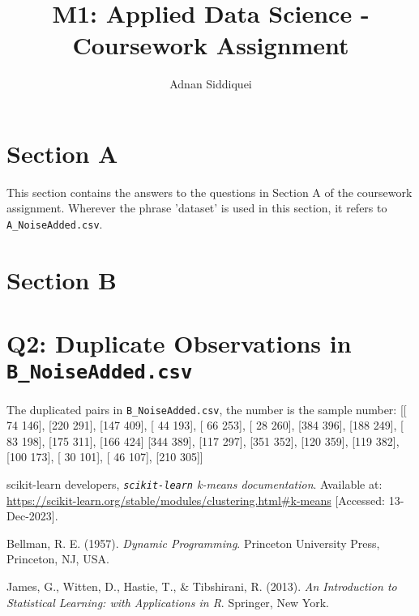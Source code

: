 \documentclass[a4paper,11pt]{article}
\title{\boldmath M1: Applied Data Science - Coursework Assignment}
\author{Adnan Siddiquei}
\affiliation{University of Cambridge}
\newcommand{\inlinecode}[1]{\lstinline{#1}}
\begin{document}
\maketitle
\flushbottom


\section{Section A}\label{sec:section-a}
This section contains the answers to the questions in Section A of the coursework assignment.
Wherever the phrase 'dataset' is used in this section, it refers to \inlinecode{A_NoiseAdded.csv}.





\section{Section B}\label{sec:section-b}


\appendix

\section{Q2: Duplicate Observations in \inlinecode{B_NoiseAdded.csv}}\label{appendix:q2}
The duplicated pairs in \inlinecode{B_NoiseAdded.csv}, the number is the sample number:
[[ 74 146], [220 291], [147 409], [ 44 193], [ 66 253], [ 28 260], [384 396], [188 249], [ 83 198], [175 311], [166 424]
 [344 389], [117 297], [351 352], [120 359], [119 382], [100 173], [ 30 101], [ 46 107], [210 305]]


\begin{thebibliography}{99}

scikit-learn developers,
\textit{\inlinecode{scikit-learn} k-means documentation}.
Available at: \url{https://scikit-learn.org/stable/modules/clustering.html#k-means}
[Accessed: 13-Dec-2023].

Bellman, R. E. (1957).
\textit{Dynamic Programming}.
Princeton University Press, Princeton, NJ, USA.

James, G., Witten, D., Hastie, T., \& Tibshirani, R. (2013).
\textit{An Introduction to Statistical Learning: with Applications in R}.
Springer, New York.


\end{thebibliography}
\end{document}
